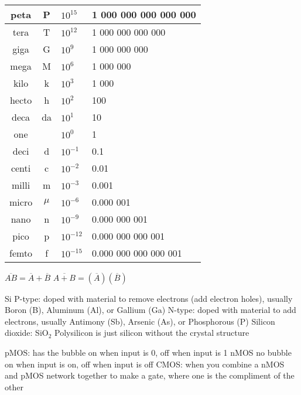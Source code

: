 \documentclass[12pt]{article}
\begin{document}
\begin{spacing}{0.8}
\begin{multicols*}{2}
\begin{flushleft}
\begin{outline}[longenum]
 \\
\begin{tabular}{|c c l l|}                                   \hline
peta  & P     & $10^{ 15}$ & \hfill 1 000 000 000 000 000 \\ \hline
tera  & T     & $10^{ 12}$ & \hfill     1 000 000 000 000 \\ \hline
giga  & G     & $10^{  9}$ & \hfill         1 000 000 000 \\ \hline
mega  & M     & $10^{  6}$ & \hfill             1 000 000 \\ \hline
kilo  & k     & $10^{  3}$ & \hfill                 1 000 \\ \hline
hecto & h     & $10^{  2}$ & \hfill                   100 \\ \hline
deca  & da    & $10^{  1}$ & \hfill                    10 \\ \hline
one   &       & $10^{ 0 }$ & \hfill       1 \hfill \hfill \\ \hline
deci  & d     & $10^{- 1}$ & 0.1                          \\ \hline
centi & c     & $10^{- 2}$ & 0.01                         \\ \hline
milli & m     & $10^{- 3}$ & 0.001                        \\ \hline
micro & $\mu$ & $10^{- 6}$ & 0.000 001                    \\ \hline
nano  & n     & $10^{- 9}$ & 0.000 000 001                \\ \hline
pico  & p     & $10^{-12}$ & 0.000 000 000 001            \\ \hline
femto & f     & $10^{-15}$ & 0.000 000 000 000 001        \\ \hline
\end{tabular}

  \1 $\overline{AB}=\overline {A}+\overline{B}$
  \1 $\overline{A+B}=(\overline{A})(\overline{B})$

  \1 Si
  \1 P-type:
    \2 doped with material to remove electrons (add electron holes), usually Boron (B), Aluminum (Al), or Gallium (Ga)
  \1 N-type:
    \2 doped with material to add electrons, usually Antimony (Sb), Arsenic (As), or Phosphorous (P)
  \1 Silicon dioxide: SiO$_2$
  \1 Polysilicon is just silicon without the crystal structure

  \1 pMOS:
    \2 has the bubble
    \2 on when input is 0, off when input is 1
  \1 nMOS
    \2 no bubble
    \2 on when input is on, off when input is off
  \1 CMOS: when you combine a nMOS and pMOS network together to make a gate, where one is the compliment of the other


\end{outline}
\end{flushleft}
\end{multicols*}
\end{spacing}
\end{document}
